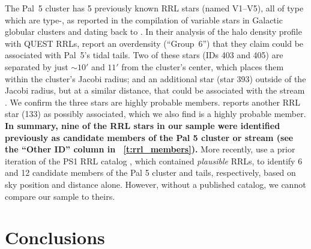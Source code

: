 \documentclass[twocolumn]{aastex63}
\newcommand{\changes}[1]{{\textbf{#1}}}
\begin{document}
The Pal~5 cluster has 5 previously known RRL stars (named V1--V5), all of type which are type-\typec, as reported in the \citet{Clement:2001} compilation of variable stars in Galactic globular clusters and dating back to \citet{Kinman:1962}.
In their analysis of the halo density profile with QUEST RRLs, \citet{Vivas:2006} report an overdensity (``Group~6'') that they claim could be associated with Pal~5's tidal tails.
Two of these stars (IDs 403 and 405) are separated by just $\sim10'$ and $11'$ from the cluster's center, which places them within the cluster's Jacobi radius; and an additional star (star 393) outside of the Jacobi radius, but at a similar distance, that could be associated with the stream \citep{Vivas:2006}. We confirm the three stars are highly probable members. \citet{Wu:2005} reports another RRL star (133) as possibly associated, which we also find is a highly probable member. \changes{In summary, nine of the RRL stars in our sample were identified previously as candidate members of the Pal 5 cluster or stream (see the ``Other ID'' column in \tablename~\ref{t:rrl_members}).} More recently, \citet{Ibata:2017} use a prior iteration of the PS1 RRL catalog \citep{Hernitschek:2016}, which contained \emph{plausible} RRLs, to identify 6 and 12 candidate members of the Pal 5 cluster and tails, respectively, based on sky position and distance alone. However, without a published catalog, we cannot compare our sample to theirs.



\section{Conclusions} \label{sec:conclusions}
\end{document}
